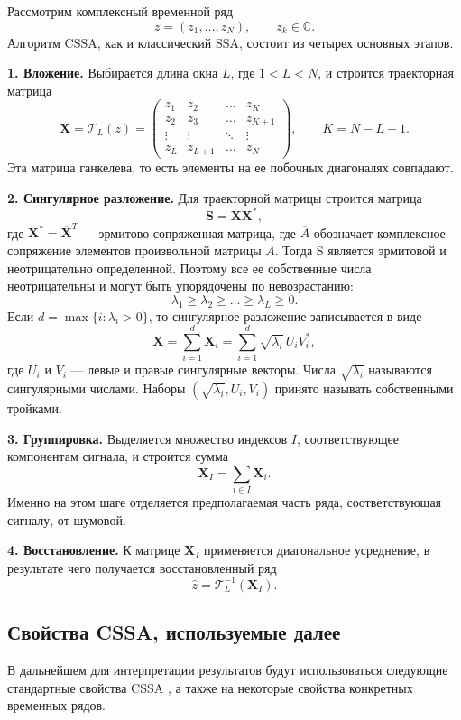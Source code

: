 Рассмотрим комплексный временной ряд
\[
z = (z_1,\dots,z_N), \qquad z_k \in \mathbb{C}.
\]
Алгоритм CSSA, как и классический SSA, состоит из четырех основных этапов.

\textbf{1. Вложение.}
Выбирается длина окна $L$, где $1 < L < N$, и строится траекторная матрица
\[
\mathbf{X} = \mathcal{T}_L(z) =
\begin{pmatrix}
	z_1 & z_2 & \dots & z_K \\
	z_2 & z_3 & \dots & z_{K+1} \\
	\vdots & \vdots & \ddots & \vdots \\
	z_L & z_{L+1} & \dots & z_N
\end{pmatrix},
\qquad K = N-L+1.
\]
Эта матрица ганкелева, то есть элементы на ее побочных диагоналях совпадают.

\textbf{2. Сингулярное разложение.}
Для траекторной матрицы строится матрица
\[
\mathbf{S} = \mathbf{X}\mathbf{X}^{*},
\]
где $\mathbf{X}^{*} = \overline{\mathbf{X}}^{T}$ --- эрмитово сопряженная матрица, где $\overline{A}$ обозначает комплексное сопряжение элементов произвольной матрицы $A$. Тогда S является эрмитовой и неотрицательно определенной. Поэтому все ее собственные числа неотрицательны и могут быть упорядочены по невозрастанию:
\[
\lambda_1 \ge \lambda_2 \ge \dots \ge \lambda_L \ge 0.
\]
Если $d=\max\{i\colon \lambda_i>0\}$, то сингулярное разложение записывается в виде
\[
\mathbf{X} = \sum_{i=1}^{d}\mathbf{X}_i
=
\sum_{i=1}^{d}\sqrt{\lambda_i}\,U_iV_i^{*},
\]
где $U_i$ и $V_i$ --- левые и правые сингулярные векторы. Числа $\sqrt{\lambda_i}$ называются сингулярными числами. Наборы $(\sqrt{\lambda_i},U_i,V_i)$ принято называть собственными тройками.

\textbf{3. Группировка.}
Выделяется множество индексов $I$, соответствующее компонентам сигнала, и строится сумма
\[
\mathbf{X}_I = \sum_{i\in I}\mathbf{X}_i.
\]
Именно на этом шаге отделяется предполагаемая часть ряда, соответствующая сигналу, от шумовой.

\textbf{4. Восстановление.}
К матрице $\mathbf{X}_I$ применяется диагональное усреднение, в результате чего получается восстановленный ряд
\[
\widehat{z} = \mathcal{T}_L^{-1}(\mathbf{X}_I).
\]

\subsection*{Свойства CSSA, используемые далее}

В дальнейшем для интерпретации результатов будут использоваться следующие стандартные свойства CSSA \cite{ts_structure,ssa_with_r,zhornikova2016}, а также на некоторые свойства конкретных временных рядов.

